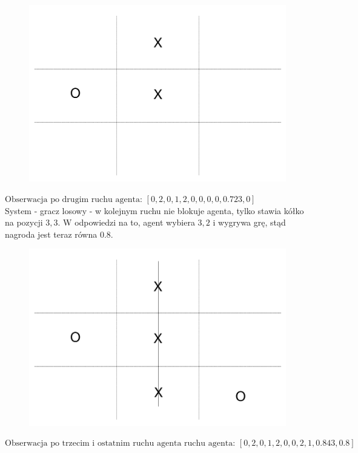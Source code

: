 \documentclass[licencjacka]{pracamgr}
\begin{document}
\begin{figure}[h!]
	\includegraphics [scale=0.2] {ttt_5.png}
	\caption{}
	\label{Rys28}
\end{figure} 
$\text{Obserwacja po drugim ruchu agenta:  }[0, 2, 0, 1, 2, 0, 0, 0, 0, 0.723, 0]$\\

System - gracz losowy - w kolejnym ruchu nie blokuje agenta, tylko stawia kółko na pozycji $3,3$. W odpowiedzi na to, agent wybiera $3,2$ i wygrywa grę, stąd nagroda jest teraz równa $0.8$.

\begin{figure}[h!]
	\includegraphics [scale=0.2] {ttt_8.png}
	\caption{}
	\label{Rys29}
\end{figure} 
$\text{Obserwacja po trzecim i ostatnim ruchu agenta ruchu agenta:  }[0, 2, 0, 1, 2, 0, 0, 2, 1, 0.843, 0.8]$\\
\end{document}
